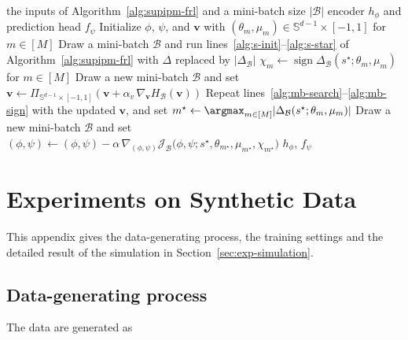 \documentclass{article} %
\begin{document}
\begin{algorithm}[H]
\caption{supFR with mini-batches}
\label{alg:supipm-frl-mb}
\begin{algorithmic}[1]
\REQUIRE the inputs of Algorithm~\ref{alg:supipm-frl} and a mini-batch size $|\mathcal{B}|$
\ENSURE encoder $h_{\phi}$ and prediction head $f_{\psi}$
\STATE Initialize $\phi$, $\psi$, and $\mathbf{v}$ with $(\theta_m,\mu_m)\in\mathbb{S}^{d-1}\times[-1,1]$ for $m\in[M]$
    \STATE Draw a mini-batch $\mathcal{B}$ and run lines~\ref{alg:s-init}--\ref{alg:s-star} of Algorithm~\ref{alg:supipm-frl} with $\Delta$ replaced by $|\Delta_{\mathcal{B}}|$ \label{alg:mb-search}
    \STATE $\chi_m\leftarrow\operatorname{sign}\Delta_{\mathcal{B}}(s^{\star};\theta_m,\mu_m)$ for $m\in[M]$ \label{alg:mb-sign}
    \STATE Draw a new mini-batch $\mathcal{B}$ and set $\mathbf{v}\leftarrow\Pi_{\mathbb{S}^{d-1}\times[-1,1]}\!\left(\mathbf{v}+\alpha_v\,\nabla_{\mathbf{v}}H_{\mathcal{B}}(\mathbf{v})\right)$
  \ENDFOR
  \STATE Repeat lines~\ref{alg:mb-search}--\ref{alg:mb-sign} with the updated $\mathbf{v}$, and set $m^{\star}\leftarrow\argmax_{m\in[M]}|\Delta_{\mathcal{B}}(s^{\star};\theta_m,\mu_m)|$
  \STATE Draw a new mini-batch $\mathcal{B}$ and set $(\phi,\psi)\leftarrow(\phi,\psi)-\alpha\,\nabla_{(\phi,\psi)}\mathcal{J}_{\mathcal{B}}\bigl(\phi,\psi;s^{\star},\theta_{m^{\star}},\mu_{m^{\star}},\chi_{m^{\star}}\bigr)$
\ENDFOR
\RETURN $h_{\phi}$, $f_{\psi}$
\end{algorithmic}
\end{algorithm}


\section{Experiments on Synthetic Data}
\label{app:synth-experiments}

This appendix gives the data-generating process, the training settings and the detailed result of the simulation in Section~\ref{sec:exp-simulation}.

\subsection{Data-generating process}
\label{app:synth-generative}

The data are generated as
\end{document}
